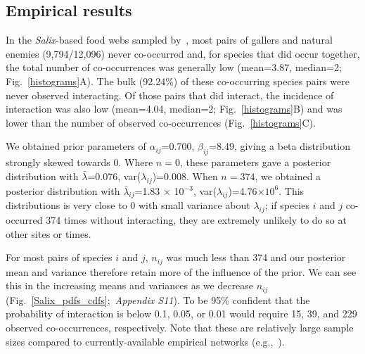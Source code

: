 \documentclass[12pt]{article}
\begin{document}
\begin{spacing}{2.0}
\subsection*{Empirical results}

  In the \emph{Salix}-based food webs sampled by~\citet{Kopelke2017}, most pairs of gallers and natural enemies (9,794/12,096) never co-occurred and, for species that did occur together, the total number of co-occurrences was generally low (mean=3.87, median=2; Fig.~\ref{histograms}A). The bulk (92.24\%) of these co-occurring species pairs were never observed interacting. Of those pairs that did interact, the incidence of interaction was also low (mean=4.04, median=2; Fig.~\ref{histograms}B) and was lower than the number of observed co-occurrences (Fig.~\ref{histograms}C).


  We obtained prior parameters of $\alpha_{ij}$=0.700, $\beta_{ij}$=8.49, giving a beta distribution strongly skewed towards 0. Where $n=0$, these parameters gave a posterior distribution with $\bar\lambda$=0.076, var($\lambda_{ij}$)=0.008. When $n=374$, we obtained a posterior distribution with $\bar\lambda_{ij}$=1.83 $\times$ 10$^{-3}$, var($\lambda_{ij}$)=4.76$\times10^6$. This distributions is very close to 0 with small variance about $\lambda_{ij}$; if species $i$ and $j$ co-occurred 374 times without interacting, they are extremely unlikely to do so at other sites or times. 


  For most pairs of species $i$ and $j$, $n_{ij}$ was much less than 374 and our posterior mean and variance therefore retain more of the influence of the prior. We can see this in the increasing means and variances as we decrease $n_{ij}$ (Fig.~\ref{Salix_pdfs_cdfs};~\emph{Appendix S11}). To be 95\% confident that the probability of interaction is below 0.1, 0.05, or 0.01 would require 15, 39, and 229 observed co-occurrences, respectively. Note that these are relatively large sample sizes compared to currently-available empirical networks (e.g.,~\citealp{Morris2014}).




\end{spacing}
\end{document}
